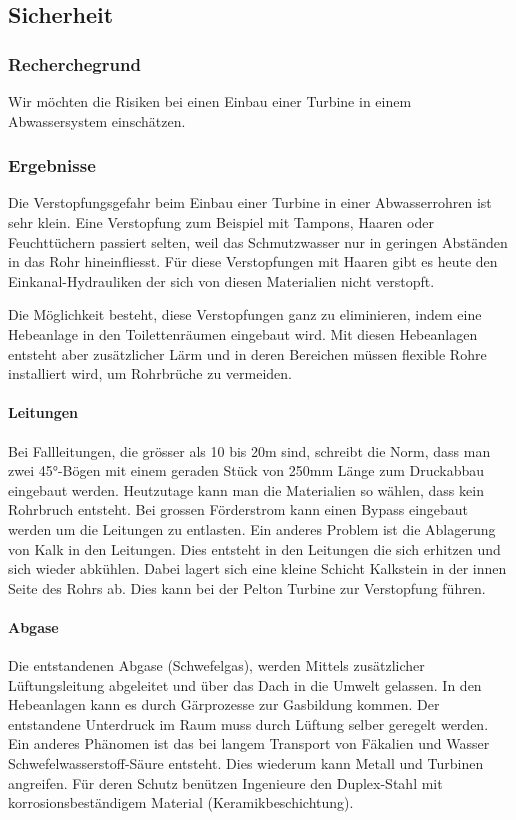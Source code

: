 \subsection{Sicherheit}


\subsubsection{Recherchegrund}
Wir möchten die Risiken bei einen Einbau einer Turbine in einem Abwassersystem  einschätzen.

\subsubsection{Ergebnisse}
Die Verstopfungsgefahr beim Einbau einer Turbine in einer Abwasserrohren ist sehr klein. 
Eine Verstopfung zum Beispiel mit Tampons, Haaren oder Feuchttüchern passiert selten, weil das Schmutzwasser nur in geringen Abständen in das Rohr hineinfliesst. 
Für diese Verstopfungen mit Haaren gibt es heute den Einkanal-Hydrauliken der sich von diesen Materialien nicht verstopft.

Die Möglichkeit besteht, diese Verstopfungen ganz zu eliminieren, indem eine Hebeanlage in den Toilettenräumen eingebaut wird. Mit diesen Hebeanlagen entsteht aber zusätzlicher Lärm und in deren Bereichen müssen flexible Rohre installiert wird, um Rohrbrüche zu vermeiden.
\paragraph{Leitungen}
Bei Fallleitungen, die grösser als 10 bis 20\si{m} sind, schreibt die Norm, dass man zwei 45°-Bögen mit einem geraden Stück von 250\si{mm} Länge zum Druckabbau eingebaut werden. Heutzutage kann man die Materialien so wählen, dass kein Rohrbruch entsteht. Bei grossen Förderstrom kann einen Bypass eingebaut werden um die Leitungen zu entlasten. 
Ein anderes Problem ist die Ablagerung von Kalk in den Leitungen. Dies entsteht in den Leitungen die sich erhitzen und sich wieder abkühlen. Dabei lagert sich eine kleine Schicht Kalkstein in der innen Seite des Rohrs ab. Dies kann bei der Pelton Turbine zur Verstopfung führen.
\paragraph{Abgase}
Die entstandenen Abgase (Schwefelgas), werden Mittels zusätzlicher Lüftungsleitung abgeleitet und über das Dach in die Umwelt gelassen. In den Hebeanlagen kann es durch Gärprozesse zur Gasbildung kommen. Der entstandene Unterdruck im Raum muss durch Lüftung selber geregelt werden. 
Ein anderes Phänomen ist das bei langem Transport von Fäkalien und Wasser Schwefelwasserstoff-Säure entsteht. Dies wiederum kann Metall und Turbinen angreifen. Für deren Schutz benützen Ingenieure den Duplex-Stahl mit korrosionsbeständigem Material (Keramikbeschichtung).




